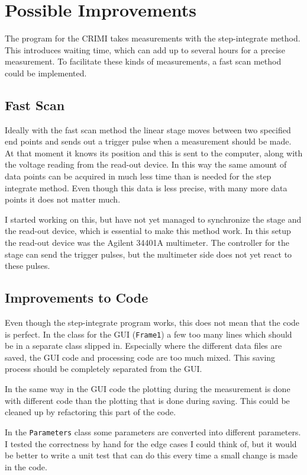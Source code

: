 
\section{Possible Improvements}

The program for the CRIMI takes measurements with the step-integrate method. This introduces waiting time, which can add up to several hours for a precise measurement. To facilitate these kinds of measurements, a fast scan method could be implemented.

\subsection{Fast Scan}
Ideally with the fast scan method the linear stage moves between two specified end points and sends out a trigger pulse when a measurement should be made. At that moment it knows its position and this is sent to the computer, along with the voltage reading from the read-out device. In this way the same amount of data points can be acquired in much less time than is needed for the step integrate method. Even though this data is less precise, with many more data points it does not matter much.

I started working on this, but have not yet managed to synchronize the stage and the read-out device, which is essential to make this method work. In this setup the read-out device was the Agilent 34401A multimeter. The controller for the stage can send the trigger pulses, but the multimeter side does not yet react to these pulses.

\subsection{Improvements to Code}
Even though the step-integrate program works, this does not mean that the code is perfect. In the class for the GUI (\verb!Frame1!) a few too many lines which should be in a separate class slipped in. Especially where the different data files are saved, the GUI code and processing code are too much mixed. This saving process should be completely separated from the GUI.

In the same way in the GUI code the plotting during the measurement is done with different code than the plotting that is done during saving. This could be cleaned up by refactoring this part of the code.

In the \verb!Parameters! class some parameters are converted into different parameters. I tested the correctness by hand for the edge cases I could think of, but it would be better to write a unit test that can do this every time a small change is made in the code. 

